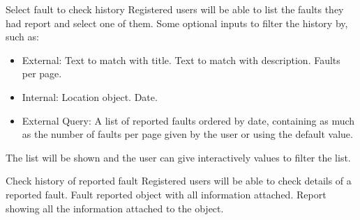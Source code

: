 \begin{requirement}{Select fault to check history}
\reqdesc Registered users will be able to list the faults they had report and select one of them.
\reqin Some optional inputs to filter the history by, such as:
\begin{itemize}
	\item External:
	\subitem Text to match with title.
	\subitem Text to match with description.
	\subitem Faults per page.
	\item Internal:
	\subitem Location object.
	\subitem Date.
\end{itemize}
\reqout 
\begin{itemize}
	\item External Query:
	\subitem A list of reported faults ordered by date, containing as much as the number of faults per page given by the user or using the default value.
\end{itemize}
\reqsteps The list will be shown and the user can give interactively values to filter the list.
\end{requirement}

\begin{requirement}{Check history of reported fault}
\reqdesc Registered users will be able to check details of a reported fault.
\reqin Fault reported object with all information attached.
\reqout Report showing all the information attached to the object.
\end{requirement}
